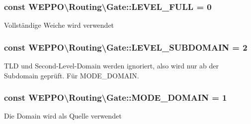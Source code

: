 \subsubsection[{\texorpdfstring{L\+E\+V\+E\+L\+\_\+\+F\+U\+LL}{LEVEL_FULL}}]{\setlength{\rightskip}{0pt plus 5cm}const W\+E\+P\+P\+O\textbackslash{}\+Routing\textbackslash{}\+Gate\+::\+L\+E\+V\+E\+L\+\_\+\+F\+U\+LL = 0}\hypertarget{classWEPPO_1_1Routing_1_1Gate_a24835577fd5362264520625cd0fa358e}{}\label{classWEPPO_1_1Routing_1_1Gate_a24835577fd5362264520625cd0fa358e}
Vollständige Weiche wird verwendet 
\subsubsection[{\texorpdfstring{L\+E\+V\+E\+L\+\_\+\+S\+U\+B\+D\+O\+M\+A\+IN}{LEVEL_SUBDOMAIN}}]{\setlength{\rightskip}{0pt plus 5cm}const W\+E\+P\+P\+O\textbackslash{}\+Routing\textbackslash{}\+Gate\+::\+L\+E\+V\+E\+L\+\_\+\+S\+U\+B\+D\+O\+M\+A\+IN = 2}\hypertarget{classWEPPO_1_1Routing_1_1Gate_a64916c1484e8d22de9b9371e42e345a0}{}\label{classWEPPO_1_1Routing_1_1Gate_a64916c1484e8d22de9b9371e42e345a0}
T\+LD und Second-\/\+Level-\/\+Domain werden ignoriert, also wird nur ab der Subdomain geprüft. Für M\+O\+D\+E\+\_\+\+D\+O\+M\+A\+IN. 
\subsubsection[{\texorpdfstring{M\+O\+D\+E\+\_\+\+D\+O\+M\+A\+IN}{MODE_DOMAIN}}]{\setlength{\rightskip}{0pt plus 5cm}const W\+E\+P\+P\+O\textbackslash{}\+Routing\textbackslash{}\+Gate\+::\+M\+O\+D\+E\+\_\+\+D\+O\+M\+A\+IN = 1}\hypertarget{classWEPPO_1_1Routing_1_1Gate_ace0b76502180ef1c36c4bf157a8e940d}{}\label{classWEPPO_1_1Routing_1_1Gate_ace0b76502180ef1c36c4bf157a8e940d}
Die Domain wird als Quelle verwendet 
